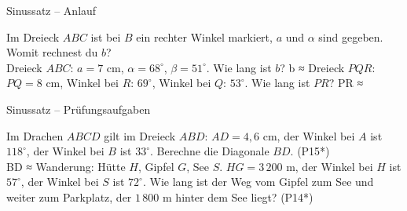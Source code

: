 \setcounter{aufgabe}{0}

\begin{aufgabe}{Sinussatz – Anlauf}
\begin{teile}
\teil Im Dreieck $ABC$ ist bei $B$ ein rechter Winkel markiert, $a$ und $\alpha$ sind gegeben. Womit rechnest du $b$? \\  
\teil Dreieck $ABC$: $a = 7$ cm, $\alpha = 68^\circ$, $\beta = 51^\circ$. Wie lang ist $b$? b ≈ \leerfeld[cm]
\teil Dreieck $PQR$: $PQ = 8$ cm, Winkel bei $R$: $69^\circ$, Winkel bei $Q$: $53^\circ$. Wie lang ist $PR$? PR ≈ \leerfeld[cm]
\end{teile}
\end{aufgabe}

\begin{aufgabe}{Sinussatz – Prüfungsaufgaben}
\begin{teile}
\steil Im Drachen $ABCD$ gilt im Dreieck $ABD$: $AD = 4{,}6$ cm, der Winkel bei $A$ ist $118^\circ$, der Winkel bei $B$ ist $33^\circ$. Berechne die Diagonale $BD$. \hfill (P15*) \\ BD ≈ \leerfeld[cm]
\steil Wanderung: Hütte $H$, Gipfel $G$, See $S$. $HG = 3\,200$ m, der Winkel bei $H$ ist $57^\circ$, der Winkel bei $S$ ist $72^\circ$. Wie lang ist der Weg vom Gipfel zum See und weiter zum Parkplatz, der $1\,800$ m hinter dem See liegt? \hfill (P14*) \\ \leerfeld[km]
\end{teile}
\end{aufgabe}

